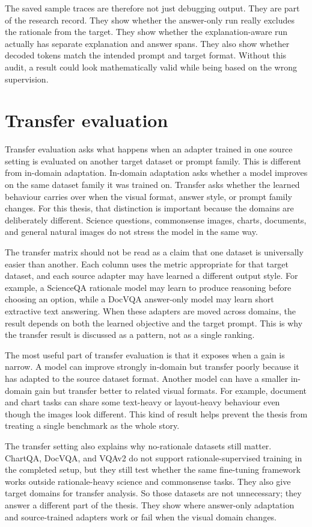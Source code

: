 The saved sample traces are therefore not just debugging output.
They are part of the research record.
They show whether the answer-only run really excludes the rationale from the target.
They show whether the explanation-aware run actually has separate explanation and answer spans.
They also show whether decoded tokens match the intended prompt and target format.
Without this audit, a result could look mathematically valid while being based on the wrong supervision.

\section{Transfer evaluation}
Transfer evaluation asks what happens when an adapter trained in one source setting is evaluated on another target dataset or prompt family.
This is different from in-domain adaptation.
In-domain adaptation asks whether a model improves on the same dataset family it was trained on.
Transfer asks whether the learned behaviour carries over when the visual format, answer style, or prompt family changes.
For this thesis, that distinction is important because the domains are deliberately different.
Science questions, commonsense images, charts, documents, and general natural images do not stress the model in the same way.

The transfer matrix should not be read as a claim that one dataset is universally easier than another.
Each column uses the metric appropriate for that target dataset, and each source adapter may have learned a different output style.
For example, a ScienceQA rationale model may learn to produce reasoning before choosing an option, while a DocVQA answer-only model may learn short extractive text answering.
When these adapters are moved across domains, the result depends on both the learned objective and the target prompt.
This is why the transfer result is discussed as a pattern, not as a single ranking.

The most useful part of transfer evaluation is that it exposes when a gain is narrow.
A model can improve strongly in-domain but transfer poorly because it has adapted to the source dataset format.
Another model can have a smaller in-domain gain but transfer better to related visual formats.
For example, document and chart tasks can share some text-heavy or layout-heavy behaviour even though the images look different.
This kind of result helps prevent the thesis from treating a single benchmark as the whole story.

The transfer setting also explains why no-rationale datasets still matter.
ChartQA, DocVQA, and VQAv2 do not support rationale-supervised training in the completed setup, but they still test whether the same fine-tuning framework works outside rationale-heavy science and commonsense tasks.
They also give target domains for transfer analysis.
So those datasets are not unnecessary; they answer a different part of the thesis.
They show where answer-only adaptation and source-trained adapters work or fail when the visual domain changes.

